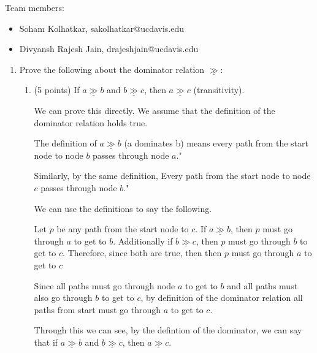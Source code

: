 \documentclass[12pt]{article}
\newcommand{\dom}{\underline{\gg}}
\begin{document}
\begin{mdframed}
  Team members:
  \begin{itemize}
    \item Soham Kolhatkar, sakolhatkar@ucdavis.edu %
    \item Divyansh Rajesh Jain, drajeshjain@ucdavis.edu %
  \end{itemize}
\end{mdframed}

\newpage
\begin{enumerate}

  
  \item Prove the following about the dominator relation $\dom$:
  \begin{enumerate}
    \item (5 points) If $a \dom b$ and $b \dom c$, then $a \dom c$
    (transitivity).
    \begin{mdframed}
      We can prove this directly. We assume that the definition of the dominator relation holds true.

      The definition of $a \dom b$ (a dominates b) means every path from the start node to node $b$ passes through node $a$."

    Similarly, by the same definition, Every path from the start node to node $c$ passes through node $b$."
    

    We can use the definitions to say the following.

    Let $p$ be any path from the start node to $c$. If $a \dom b$, then $p$ must go through $a$ to get to $b$. Additionally if $b \dom c$,  then $p$ must go through $b$ to get to $c$. Therefore, since both are true, then  then $p$ must go through $a$ to get to $c$

    

    Since all paths must go through node $a$ to get to $b$ and all paths must also go through $b$ to get to $c$, by definition of the dominator relation all paths from start  must go through $a$ to get to $c$. 

    Through this we can see, by the defintion of the dominator, we can say that if $a \dom b$ and $b \dom c$, then $a \dom c$.
      
    \end{mdframed}


\end{enumerate}
\end{enumerate}
\end{document}
